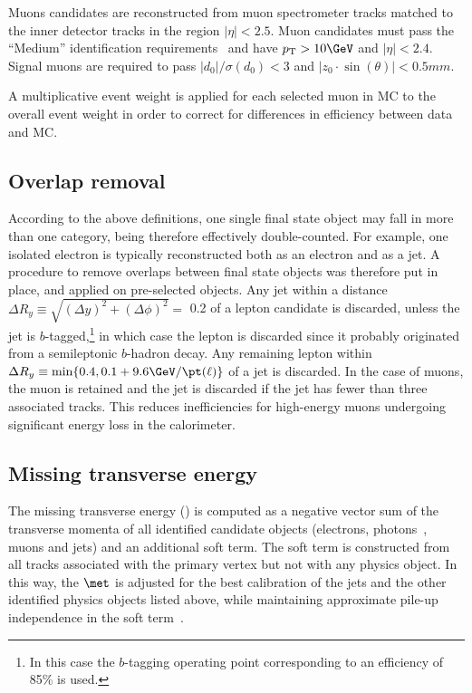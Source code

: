 Muons candidates are reconstructed from muon spectrometer tracks matched to 
the inner detector tracks in the region $|\eta|<2.5$.
Muon candidates must pass the ``Medium'' identification 
requirements~\cite{Aad:2016jkr} and have  $p_\mathrm{T} > 10\GeV$ and 
$|\eta| < 2.4$. 
Signal muons are required to pass $\vert d_0\vert/\sigma(d_0) < 3$
and $|z_0 \cdot\sin(\theta)|<0.5 mm$.
 
A multiplicative event weight is applied for each selected muon in MC to the overall event weight 
in order to correct for differences in efficiency between data and MC.

\subsection*{Overlap removal}
\label{subsec:sec.strategy.sel.objects_overlap_removal}

According to the above definitions, one single final state object may fall in more than one category, being therefore effectively double-counted. 
For example, one isolated electron is typically reconstructed both as an electron and as a jet. 
A procedure to remove overlaps between final state objects was therefore put in place, and applied on pre-selected objects. 
Any jet within a distance $\Delta R_y \equiv \sqrt{(\Delta y)^2+(\Delta\phi)^2} =$ 0.2 of a lepton candidate is discarded, 
unless the jet is $b$-tagged,\footnote{In this case the $b$-tagging operating point corresponding to an efficiency of 85\% is used.} 
in which case the lepton is discarded since it probably originated from a semileptonic $b$-hadron decay. 
Any remaining lepton within $\Delta R_y \equiv \operatorname{min}\{0.4, 0.1 + 9.6 \GeV/\pt(\ell)\}$ of a jet is discarded. 
In the case of muons, the muon is retained and the jet is discarded if the jet has fewer than three associated tracks. This reduces 
inefficiencies for high-energy muons undergoing significant energy loss in the calorimeter. 

\subsection*{Missing transverse energy}
\label{subsec:sec.strategy.sel.objects_met}

The missing transverse energy (\met) is computed as a negative vector sum of 
the transverse momenta 
of all identified candidate objects (electrons, photons~\cite{Aaboud:2016yuq}, muons and jets) and an additional soft term. 
The soft term is constructed from all tracks associated with the primary vertex but not with any physics object. 
In this way, the $\met$ is adjusted for the best calibration of the jets and the other identified physics objects listed above, 
while maintaining approximate pile-up independence in the soft term~\cite{ATL-PHYS-PUB-2015-027, ATL-PHYS-PUB-2015-023}.
